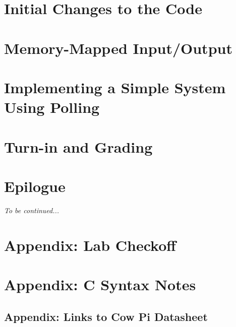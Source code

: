     \section{Initial Changes to the Code} \label{sec:LabTime}                       

    \section{Memory-Mapped Input/Output} \label{sec:MemMapIO}                       

    \section {Implementing a Simple System Using Polling} \label{sec:SimpleSystem}  

    \section{Turn-in and Grading}                                                   

    \section*{Epilogue}                                                             \JeffGoldblum

    \textit{To be continued...}

    \newpage\appendix

    \section{Appendix: Lab Checkoff}                                                


    \section{Appendix: C Syntax Notes}                                              

    \newpage

    \begin{landscape}
        \section{Appendix: Links to Cow Pi Datasheet}                               
    \end{landscape}


